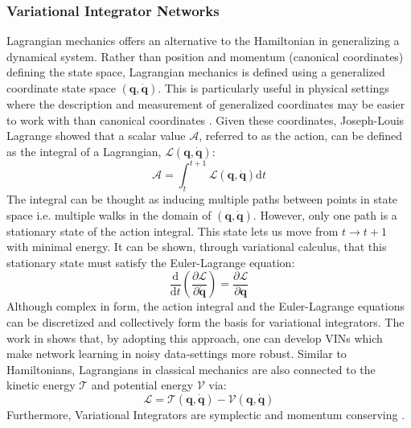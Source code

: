 \documentclass{article}
\begin{document}
\subsubsection*{Variational Integrator Networks}

Lagrangian mechanics offers an alternative to the Hamiltonian in generalizing a dynamical system. Rather than position and momentum (canonical coordinates) defining the state space, Lagrangian mechanics is defined using a generalized coordinate state space $(\mathbf{q},\dot{\mathbf{q}})$. This is particularly useful in physical settings where the description and measurement of generalized coordinates may be easier to work with than canonical coordinates \cite{marsden_discrete_2001}. Given these coordinates, Joseph-Louis Lagrange showed that a scalar value $\mathcal{A}$, referred to as the action, can be defined as the integral of a Lagrangian, $\mathcal{L}(\mathbf{q},\dot{\mathbf{q}})$:
\begin{equation}
\mathcal{A} = \int_{t}^{t+1} \mathcal{L}(\mathbf{q},\dot{\mathbf{q}}) \mathrm{d}t
\label{eqn.action_integral}
\end{equation}
The integral can be thought as inducing multiple paths between points in state space i.e. multiple walks in the domain of $(\mathbf{q},\mathbf{\dot{q}})$. However, only one path is a stationary state of the action integral. This state lets us move from $t \rightarrow t+1$ with minimal energy. It can be shown, through variational calculus, that this stationary state must satisfy the Euler-Lagrange equation:
\begin{equation}
\frac{\mathrm{d} }{\mathrm{d}t} \left ( \frac{\partial \mathcal{L}}{\partial \dot{\mathbf{q}}} \right )= \frac{\partial \mathcal{L}}{\partial \mathbf{q}}
\label{eqn.euler_lagrange}
\end{equation}
Although complex in form, the action integral and the Euler-Lagrange equations can be discretized and collectively form the basis for variational integrators. The work in \cite{saemundsson_variational_2019} shows that, by adopting this approach, one can develop VINs which make network learning in noisy data-settings more robust. Similar to Hamiltonians, Lagrangians in classical mechanics are also connected to the kinetic energy $\mathcal{T}$ and potential energy $\mathcal{V}$ via:
\begin{equation}
\mathcal{L} = \mathcal{T}(\mathbf{q},\mathbf{\dot{q}}) - \mathcal{V} (\mathbf{q},\mathbf{\dot{q}})
\end{equation}
Furthermore, Variational Integrators are symplectic and momentum conserving \cite{lew_overview_nodate}.
\end{document}
